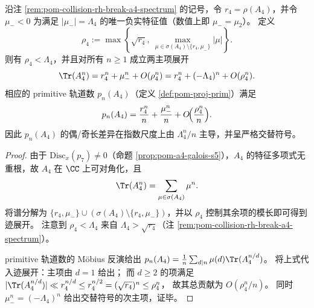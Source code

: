 \begin{proposition}\label{prop:pom-a4-trace-primitive-two-term}
沿注 \ref{rem:pom-collision-rh-break-a4-spectrum} 的记号，令 \(r_4=\rho(A_4)\)，并令 \(\mu_-<0\) 为满足 \(|\mu_-|=\Lambda_4\) 的唯一负实特征值（数值上即 \(\mu_-=\mu_2\)）。
定义
\[
\rho_4:=\max\!\left\{\sqrt{r_4},\ \max_{\mu\in\sigma(A_4)\setminus\{r_4,\mu_-\}}|\mu|\right\}.
\]
则有 \(\rho_4<\Lambda_4\)，并且对所有 \(n\ge 1\) 成立两主项展开
\[
\Tr(A_4^n)=r_4^n+\mu_-^n+O(\rho_4^n)
=r_4^n+(-\Lambda_4)^n+O(\rho_4^n).
\]
相应的 primitive 轨道数 \(p_n(A_4)\)（定义 \ref{def:pom-proj-prim}）满足
\[
p_n(A_4)=\frac{r_4^n}{n}+\frac{\mu_-^n}{n}+O\!\Bigl(\frac{\rho_4^n}{n}\Bigr).
\]
因此 \(p_n(A_4)\) 的偶/奇长差异在指数尺度上由 \(\Lambda_4^n/n\) 主导，并呈严格交替符号。
\end{proposition}
\begin{proof}
由于 \(\mathrm{Disc}_x(p_7)\neq 0\)（命题 \ref{prop:pom-a4-galois-s5}），\(A_4\) 的特征多项式无重根，故 \(A_4\) 在 \(\CC\) 上可对角化，且
\[
\Tr(A_4^n)=\sum_{\mu\in\sigma(A_4)}\mu^n.
\]
将谱分解为 \(\{r_4,\mu_-\}\cup(\sigma(A_4)\setminus\{r_4,\mu_-\})\)，并以 \(\rho_4\) 控制其余项的模长即可得到迹展开。
注意到 \(\rho_4<\Lambda_4\) 来自 \(\Lambda_4>\sqrt{r_4}\)（注 \ref{rem:pom-collision-rh-break-a4-spectrum}）。
\par
primitive 轨道数的 Möbius 反演给出
\(
p_n(A_4)=\frac{1}{n}\sum_{d\mid n}\mu(d)\Tr(A_4^{n/d})
\)。
将上式代入迹展开：主项由 \(d=1\) 给出；
而 \(d\ge 2\) 的项满足 \(|\Tr(A_4^{n/d})|\ll r_4^{n/d}\le r_4^{n/2}=(\sqrt{r_4})^n\le \rho_4^n\)，
故其总贡献为 \(O(\rho_4^n/n)\)。
同时 \(\mu_-^n=(-\Lambda_4)^n\) 给出交替符号的次主项，证毕。
\end{proof}



